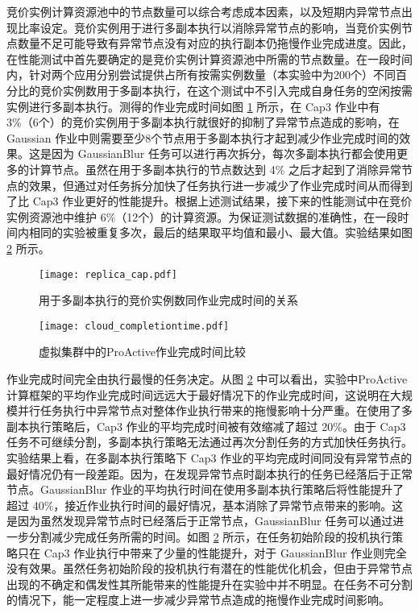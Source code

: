 竞价实例计算资源池中的节点数量可以综合考虑成本因素，以及短期内异常节点出现比率设定。竞价实例用于进行多副本执行以消除异常节点的影响，当竞价实例节点数量不足可能导致有异常节点没有对应的执行副本仍拖慢作业完成进度。因此，在性能测试中首先要确定的是竞价实例计算资源池中所需的节点数量。在一段时间内，针对两个应用分别尝试提供占所有按需实例数量（本实验中为200个）不同百分比的竞价实例数用于多副本执行，在这个测试中不引入完成自身任务的空闲按需实例进行多副本执行。测得的作业完成时间如图 \ref{figure:replica_cap} 所示，在 Cap3 作业中有 3\%（6个）的竞价实例用于多副本执行就很好的抑制了异常节点造成的影响，在 Gaussian 作业中则需要至少8个节点用于多副本执行才起到减少作业完成时间的效果。这是因为 GaussianBlur 任务可以进行再次拆分，每次多副本执行都会使用更多的计算节点。虽然在用于多副本执行的节点数达到 4\% 之后才起到了消除异常节点的效果，但通过对任务拆分加快了任务执行进一步减少了作业完成时间从而得到了比 Cap3 作业更好的性能提升。根据上述测试结果，接下来的性能测试中在竞价实例资源池中维护 6\%（12个）的计算资源。为保证测试数据的准确性，在一段时间内相同的实验被重复多次，最后的结果取平均值和最小、最大值。实验结果如图 \ref{figure:completiontime_cloud} 所示。
\begin{figure}
  \centering
  \texttt{[image: replica\_cap.pdf]}
  \caption{用于多副本执行的竞价实例数同作业完成时间的关系}
  \label{figure:replica_cap}
\end{figure}

\begin{figure}
  \centering
  \texttt{[image: cloud\_completiontime.pdf]}
  \caption{虚拟集群中的ProActive作业完成时间比较}
  \label{figure:completiontime_cloud}
\end{figure}

作业完成时间完全由执行最慢的任务决定。从图 \ref{figure:completiontime_cloud} 中可以看出，实验中ProActive计算框架的平均作业完成时间远远大于最好情况下的作业完成时间，这说明在大规模并行任务执行中异常节点对整体作业执行带来的拖慢影响十分严重。在使用了多副本执行策略后，Cap3 作业的平均完成时间被有效缩减了超过 20\%。由于 Cap3 任务不可继续分割，多副本执行策略无法通过再次分割任务的方式加快任务执行。实验结果上看，在多副本执行策略下 Cap3 作业的平均完成时间同没有异常节点的最好情况仍有一段差距。因为，在发现异常节点时副本执行的任务已经落后于正常节点。GaussianBlur 作业的平均执行时间在使用多副本执行策略后将性能提升了超过 40\%，接近作业执行时间的最好情况，基本消除了异常节点带来的影响。这是因为虽然发现异常节点时已经落后于正常节点，GaussianBlur 任务可以通过进一步分割减少完成任务所需的时间。如图 \ref{figure:completiontime_cloud} 所示，在任务初始阶段的投机执行策略只在 Cap3 作业执行中带来了少量的性能提升，对于 GaussianBlur 作业则完全没有效果。虽然任务初始阶段的投机执行有潜在的性能优化机会，但由于异常节点出现的不确定和偶发性其所能带来的性能提升在实验中并不明显。在任务不可分割的情况下，能一定程度上进一步减少异常节点造成的拖慢作业完成时间影响。

